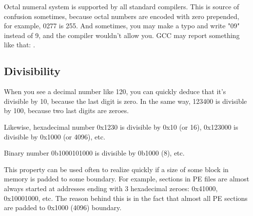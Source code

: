 Octal numeral system is supported by all standard \CCpp compilers.
This is source of confusion sometimes, because octal numbers are encoded with zero prepended, for example, 0277 is 255.
And sometimes, you may make a typo and write "09" instead of 9, and the compiler wouldn't allow you.
GCC may report something like that: .

\subsection{Divisibility}

When you see a decimal number like 120, you can quickly deduce that it's divisible by 10, because the last digit is zero.
In the same way, 123400 is divisible by 100, because two last digits are zeroes.

Likewise, hexadecimal number 0x1230 is divisible by 0x10 (or 16), 0x123000 is divisible by 0x1000 (or 4096), etc.

Binary number 0b1000101000 is divisible by 0b1000 (8), etc.

This property can be used often to realize quickly if a size of some block in memory is padded to some boundary.
For example, sections in \ac{PE} files are almost always started at addresses ending with 3 hexadecimal zeroes: 0x41000, 0x10001000, etc.
The reason behind this is in the fact that almost all \ac{PE} sections are padded to 0x1000 (4096) boundary.

